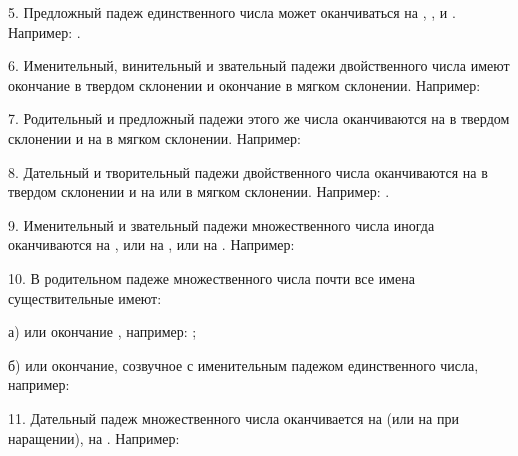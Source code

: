 \documentclass[11pt,a4paper,oneside]{memoir}
\begin{document}
    5. Предложный падеж единственного числа может оканчиваться на {}, {}, и {}. Например: {}.
    
    6. Именительный, винительный и звательный падежи двойственного числа имеют окончание {} в твердом склонении и окончание {} в мягком склонении. Например:
    
    \bigskip{}

    7. Родительный и предложный падежи этого же числа оканчиваются на {\slv{}} в твердом склонении и на {\slv{}} в мягком склонении. Например:
    
    \bigskip{}

    8. Дательный и творительный падежи двойственного числа оканчиваются на {} в твердом склонении и на {} или {} в мягком склонении. Например: {}.
    
    9. Именительный и звательный падежи множественного числа иногда оканчиваются на {\slv{}}, или на {\slv{}}, или на {\slv{}}. Например:
    
    \bigskip{}

    10. В родительном падеже множественного числа почти все имена существительные имеют:
    
    а) или окончание {}, например: {};
    
    б) или окончание, созвучное с именительным падежом единственного числа, например:
    
    \bigskip{}

    11. Дательный падеж множественного числа оканчивается на {} (или на {} при наращении), на {}. Например:
    
\end{document}
